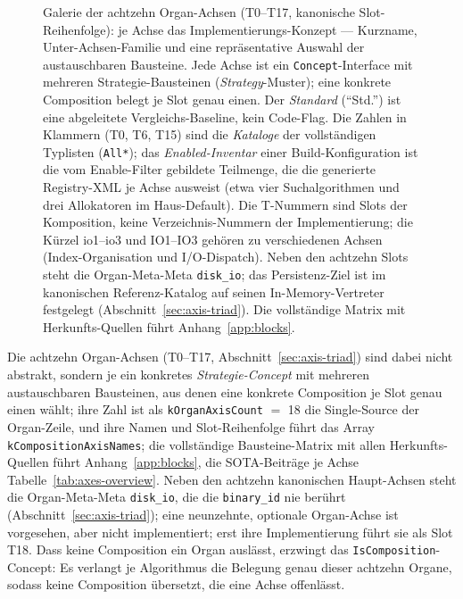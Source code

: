 \begin{nurlang}
\begin{figure}[htbp]
\caption{Galerie der achtzehn Organ-Achsen (T0--T17, kanonische Slot-Reihenfolge): je Achse das Implementierungs-Konzept --- Kurzname, Unter-Achsen-Familie und eine repräsentative Auswahl der austauschbaren Bausteine. Jede Achse ist ein \texttt{Concept}-Interface mit mehreren Strategie-Bausteinen (\emph{Strategy}-Muster); eine konkrete Composition belegt je Slot genau einen. Der \emph{Standard} (\enquote{Std.}) ist eine abgeleitete Vergleichs-Baseline, kein Code-Flag. Die Zahlen in Klammern (T0, T6, T15) sind die \emph{Kataloge} der vollständigen Typlisten (\texttt{All*}); das \emph{Enabled-Inventar} einer Build-Konfiguration ist die vom Enable-Filter gebildete Teilmenge, die die generierte Registry-XML je Achse ausweist (etwa vier Suchalgorithmen und drei Allokatoren im Haus-Default). Die T-Nummern sind Slots der Komposition, keine Verzeichnis-Nummern der Implementierung; die Kürzel io1--io3 und IO1--IO3 gehören zu verschiedenen Achsen (Index-Organisation und I/O-Dispatch). Neben den achtzehn Slots steht die Organ-Meta-Meta \texttt{disk\_io}; das Persistenz-Ziel ist im kanonischen Referenz-Katalog auf seinen In-Memory-Vertreter festgelegt (Abschnitt~\ref{sec:axis-triad}). Die vollständige Matrix mit Herkunfts-Quellen führt Anhang~\ref{app:blocks}.}\label{fig:axes-gallery}
\end{figure}
\end{nurlang}
\begin{nurkurz}
Die achtzehn Organ-Achsen (T0--T17, Abschnitt~\ref{sec:axis-triad}) sind dabei nicht abstrakt, sondern je
ein konkretes \emph{Strategie-Concept} mit mehreren austauschbaren Bausteinen, aus denen eine konkrete
Composition je Slot genau einen wählt; ihre Zahl ist als \texttt{kOrganAxisCount} $=$ 18 die Single-Source
der Organ-Zeile, und ihre Namen und Slot-Reihenfolge führt das Array \texttt{kCompositionAxisNames}; die
vollständige Bausteine-Matrix mit allen Herkunfts-Quellen führt Anhang~\ref{app:blocks}, die
SOTA-Beiträge je Achse Tabelle~\ref{tab:axes-overview}.
Neben den achtzehn kanonischen Haupt-Achsen steht die Organ-Meta-Meta \texttt{disk\_io}, die die
\texttt{binary\_id} nie berührt (Abschnitt~\ref{sec:axis-triad}); eine neunzehnte, optionale Organ-Achse
ist vorgesehen, aber nicht implementiert; erst ihre Implementierung führt sie als Slot T18. Dass keine
Composition ein Organ auslässt, erzwingt das \texttt{IsComposition}-Concept: Es verlangt je Algorithmus die
Belegung genau dieser achtzehn Organe, sodass keine Composition übersetzt, die eine Achse offenlässt.
\end{nurkurz}

